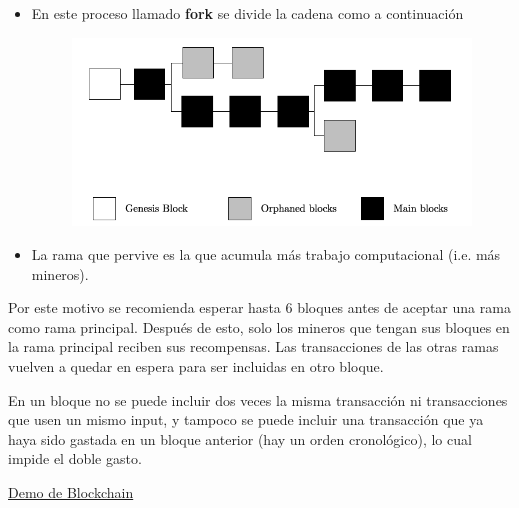 \documentclass{beamer}
\theoremstyle{definition}
\begin{document}
\begin{frame}
	\begin{itemize}
		\item<1->  En este proceso llamado \textbf{fork} se divide la cadena como a continuación
		\begin{figure}
			\includegraphics[scale=0.4]{fork}
		\end{figure}
	\item<2-> La rama que pervive es la que acumula más trabajo computacional (i.e. más mineros).
	\end{itemize}
\end{frame}

\begin{frame}
	Por este motivo se recomienda esperar hasta 6 bloques antes de aceptar una rama como rama principal. Después de esto, solo los mineros que tengan sus bloques en la rama principal reciben sus recompensas. Las transacciones de las otras ramas vuelven a quedar en espera para ser incluidas en otro bloque.\pause
	
		\begin{alertblock}{}
			En un bloque no se puede incluir dos veces la misma transacción ni transacciones que usen un mismo input, y tampoco se puede incluir una transacción que ya haya sido gastada en un bloque anterior (hay un orden cronológico), lo cual impide el doble gasto.
		\end{alertblock}
\end{frame}

\begin{frame}
	\href{https://anders.com/blockchain/}{Demo de Blockchain}
\end{frame}
\end{document}
